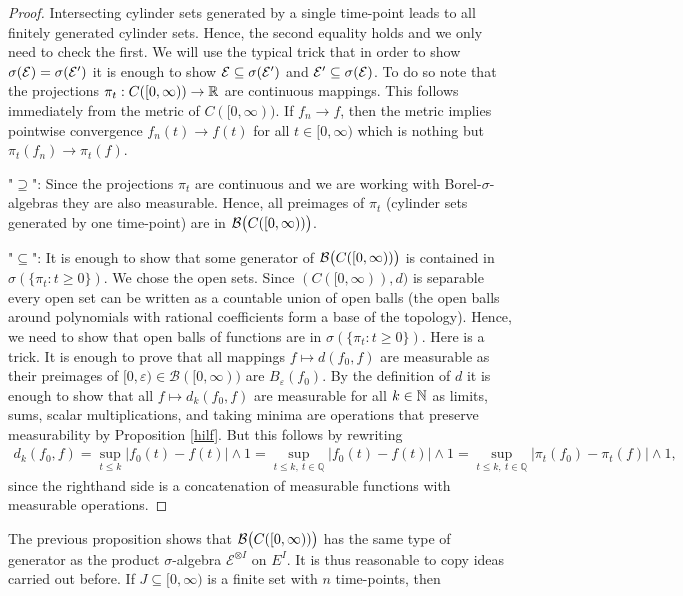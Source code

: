 \begin{proof}[Proof]
	Intersecting cylinder sets generated by a single time-point leads to all finitely generated cylinder sets. Hence, the second equality holds and we only need to check the first. We will use the typical trick that in order to show $\sigma(\mathcal{E})=\sigma(\mathcal{E}')$ it is enough to show $\mathcal{E}\subseteq \sigma(\mathcal{E}')$ and $\mathcal{E}'\subseteq \sigma(\mathcal{E})$. To do so note that the projections $\pi_t:C([0,\infty))\to \mathbb{R}$ are continuous mappings. This follows immediately from the metric of $C([0,\infty))$. If $f_n\to f$, then the metric implies pointwise convergence $f_n(t)\to f(t)$ for all $t\in [0,\infty)$ which is nothing but $\pi_t(f_n)\to \pi_t(f)$. \smallskip


	"$\supseteq$"{}: Since the projections $\pi_t$ are continuous and we are working with Borel-$\sigma$-algebras they are also measurable. Hence, all preimages of $\pi_t$ (cylinder sets generated by one time-point) are in $\mathcal{B} \big( C([0,\infty))\big)$.\smallskip
	
	"$\subseteq$"{}: It is enough to show that some generator of $\mathcal{B} \big( C([0,\infty))\big)$ is contained in $\sigma(\{ \pi_t \colon t \geq 0 \})$. We chose the open sets. Since $(C([0,\infty)),d)$ is separable every open set can be written as a countable union of open balls (the open balls around polynomials with rational coefficients form a base of the topology). Hence, we need to show that open balls of functions are in $\sigma(\{ \pi_t \colon t \geq 0 \})$. Here is a trick. It is enough to prove that all mappings $f\mapsto d(f_0,f)$ are measurable as their preimages of $[0,\varepsilon)\in \mathcal B([0,\infty))$ are $B_{\varepsilon}(f_0)$. By the definition of $d$ it is enough to show that all $f\mapsto d_k(f_0,f)$ are measurable for all $k\in\mathbb{N}$ as limits, sums, scalar multiplications, and taking minima are operations that preserve measurability by Proposition \ref{hilf}. But this follows by rewriting
	\begin{align*}
		d_k(f_0,f) = \sup_{t\leq k} | f_0(t)- f(t) | \wedge 1
		= \sup_{t\leq k,\:t\in\mathbb{Q}} | f_0(t)- f(t) | \wedge 1 
		= \sup_{t\leq k,\:t\in\mathbb{Q}} | \pi_t(f_0) - \pi_t(f) | \wedge 1,
	\end{align*}
	since the righthand side is a concatenation of measurable functions with measurable operations.
\end{proof}
The previous proposition shows that $\mathcal{B} \big( C([0,\infty))\big)$ has the same type of generator as the product $\sigma$-algebra $\mathcal E^{\otimes I}$ on $E^I$. It is thus reasonable to copy ideas carried out before. If $J\subseteq [0,\infty)$ is a finite set with $n$ time-points, then
